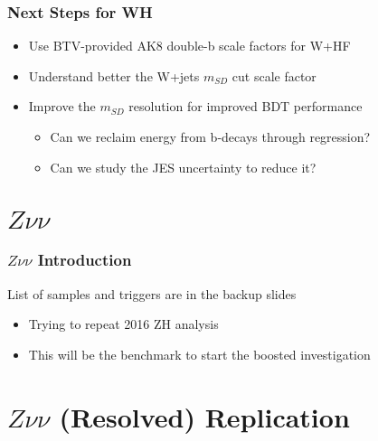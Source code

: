 \documentclass{beamer}
\begin{document}
\begin{frame}
  \frametitle{Next Steps for WH}
  \begin{itemize}
  \item Use BTV-provided AK8 double-b scale factors for W+HF
  \item Understand better the W+jets $m_{SD}$ cut scale factor
  \item Improve the $m_{SD}$ resolution for improved BDT performance
    \begin{itemize}
    \item Can we reclaim energy from b-decays through regression?
    \item Can we study the JES uncertainty to reduce it?
    \end{itemize}
  \end{itemize}
\end{frame}

\section{$Z\nu\nu$}

\begin{frame}
  \frametitle{$Z\nu\nu$ Introduction}
  List of samples and triggers are in the backup slides

  \begin{itemize}
  \item Trying to repeat 2016 ZH analysis
  \item This will be the benchmark to start the boosted investigation
  \end{itemize}

\end{frame}

\section{$Z\nu\nu$ (Resolved) Replication}
\end{document}
